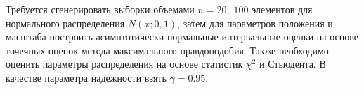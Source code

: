 {Требуется сгенерировать выборки объемами $n = 20, \; 100$ элементов для нормального распределения $N(x; 0, 1)$, затем для параметров положения и масштаба построить асимптотически нормальные интервальные оценки на основе точечных оценок метода максимального правдоподобия. Также необходимо оценить параметры распределения на основе статистик $\chi^2$ и Стьюдента. В качестве параметра надежности взять $\gamma = 0.95$.}